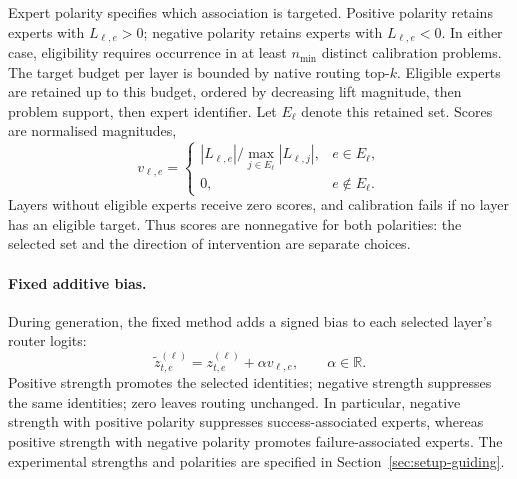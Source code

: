 \documentclass[12pt,a4paper,twoside,openright]{book}
\begin{document}
Expert polarity specifies which association is targeted. Positive polarity
retains experts with $L_{\ell,e}>0$; negative polarity retains experts with
$L_{\ell,e}<0$. In either case, eligibility requires occurrence in at least
$n_{\min}$ distinct calibration problems. The target budget per layer is
bounded by native routing top-$k$.
Eligible experts are retained up to this budget, ordered by decreasing lift magnitude, then problem support, then
expert identifier. Let $E_\ell$ denote this retained set. Scores are
normalised magnitudes,
\begin{equation}
  v_{\ell,e}=
  \begin{cases}
    |L_{\ell,e}|/\max_{j\in E_\ell}|L_{\ell,j}|, & e\in E_\ell,\\
    0, & e\notin E_\ell.
  \end{cases}
\end{equation}
Layers without eligible experts receive zero scores, and calibration fails
if no layer has an eligible target. Thus scores are nonnegative for both
polarities: the selected set and the direction of intervention are separate
choices.

\paragraph{Fixed additive bias.}
During generation, the fixed method adds a signed bias to each selected
layer's router logits:
\begin{equation}
  \widetilde z_{t,e}^{(\ell)}
  =z_{t,e}^{(\ell)}+\alpha v_{\ell,e},\qquad \alpha\in\mathbb{R}.
  \label{eq:method-identity-policy}
\end{equation}
Positive strength promotes the selected identities; negative strength
suppresses the same identities; zero leaves routing unchanged. In particular,
negative strength with positive polarity suppresses success-associated
experts, whereas positive strength with negative polarity promotes
failure-associated experts. The experimental strengths and polarities are
specified in Section~\ref{sec:setup-guiding}.
\end{document}
